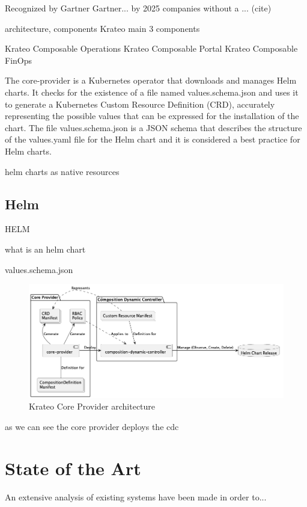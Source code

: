 Recognized by Gartner
Gartner... by 2025 companies without a ... (cite)

architecture, components
Krateo main 3 components

Krateo Composable Operations
Krateo Composable Portal
Krateo Composable FinOps





The core-provider is a Kubernetes operator that downloads and manages Helm charts. 
It checks for the existence of a file named values.schema.json and uses it to generate a Kubernetes Custom Resource Definition (CRD), accurately representing the possible values that can be expressed for the installation of the chart.
The file values.schema.json is a JSON schema that describes the structure of the values.yaml file for the Helm chart and it is considered a best practice for Helm charts.


helm charts as native resources


\subsection{Helm}

HELM

what is an helm chart

values.schema.json




\begin{figure}[htb]
    \centering
    \includegraphics[width=1\linewidth]{images/kraeto_core_provider.png}
    \caption{Krateo Core Provider architecture}
    \label{fig:krateo_core_provider}
\end{figure}

as we can see the core provider deploys the cdc




\section{State of the Art}
An extensive analysis of existing systems have been made in order to...

